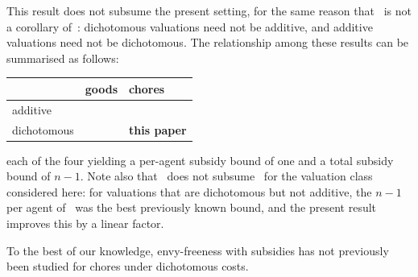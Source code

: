 This result does not subsume the present setting, for the same reason that~\cite{BKNS22} is not a corollary of~\cite{BDNSV20}: dichotomous valuations need not be additive, and additive valuations need not be dichotomous. The relationship among these results can be summarised as follows:

\begin{center}
\begin{tabular}{@{}lll@{}}
\toprule
 & goods & chores \\
\midrule
additive     & \cite{BDNSV20} & \cite{LMS26} \\
dichotomous  & \cite{BKNS22}  & \textbf{this paper} \\
\bottomrule
\end{tabular}
\end{center}

\noindent
each of the four yielding a per-agent subsidy bound of one and a total subsidy bound of $n-1$. Note also that~\cite{LMS26} does not subsume~\cite{KMSTY24} for the valuation class considered here:
for valuations that are dichotomous but not additive, the $n-1$ per agent
of~\cite{KMSTY24} was the best previously known bound, and the present result improves this by a linear factor.

To the best of our knowledge, envy-freeness with subsidies has not previously been studied for chores under dichotomous costs.